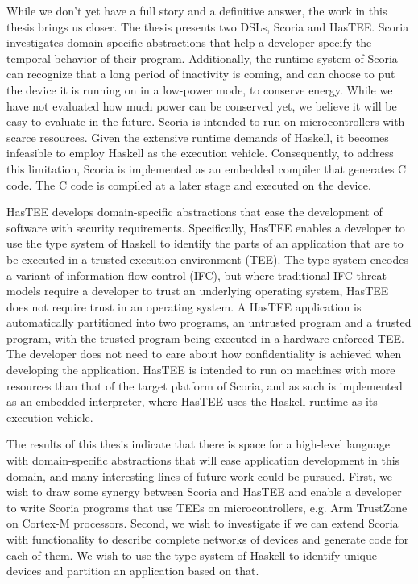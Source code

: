 While we don't yet have a full story and a definitive answer, the work in this thesis brings us closer.
The thesis presents two DSLs, Scoria and HasTEE. Scoria investigates domain-specific
abstractions that help a developer specify the temporal behavior of their program. Additionally, the runtime system of Scoria can
recognize that a long period of inactivity is coming, and can choose to put the device it is running on in a low-power mode,
to conserve energy. While we have not evaluated how much power can be conserved yet, we believe it will be easy to evaluate
in the future. Scoria is intended to run on microcontrollers with scarce resources. Given the extensive runtime demands
of Haskell, it becomes infeasible to employ Haskell as the execution vehicle. Consequently, to address this limitation, Scoria
is implemented as an embedded compiler that generates C code. The C code is compiled at a later stage and executed on the device.

HasTEE develops domain-specific abstractions that ease the development of software with security requirements. Specifically,
HasTEE enables a developer to use the type system of Haskell to identify the parts of an application that are to be executed in a
trusted execution environment (TEE). The type system encodes a variant of information-flow control (IFC), but where traditional
IFC threat models require a developer to trust an underlying operating system, HasTEE does not require trust in an operating system.
A HasTEE application is automatically partitioned into two programs, an untrusted program and a trusted program, with the trusted
program being executed in a hardware-enforced TEE. The developer does not need to care about how confidentiality
is achieved when developing the application. HasTEE is intended to run on machines with more resources than that of the target
platform of Scoria, and as such is implemented as an embedded interpreter, where HasTEE uses the Haskell runtime as its execution
vehicle.

The results of this thesis indicate that there is space for a high-level language with domain-specific abstractions
that will ease application development in this domain, and many interesting lines of future work could be pursued.
First, we wish to draw some synergy between Scoria and HasTEE and enable a developer to write Scoria programs that use TEEs on
microcontrollers, e.g. Arm TrustZone on Cortex-M processors. Second, we wish to investigate if we can extend Scoria with
functionality to describe complete networks of devices and generate code for each of them. We wish to use the type system of
Haskell to identify unique devices and partition an application based on that.

